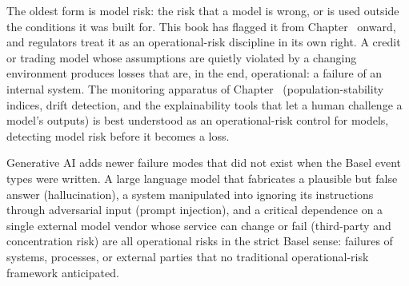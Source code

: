 \documentclass[../ai_in_finance]{subfiles}
\begin{document}
The oldest form is model risk: the risk that a model is wrong, or is used outside the conditions it was built for. This book has flagged it from Chapter~ onward, and regulators treat it as an operational-risk discipline in its own right. A credit or trading model whose assumptions are quietly violated by a changing environment produces losses that are, in the end, operational: a failure of an internal system. The monitoring apparatus of Chapter~ (population-stability indices, drift detection, and the explainability tools that let a human challenge a model's outputs) is best understood as an operational-risk control for models, detecting model risk before it becomes a loss.

Generative AI adds newer failure modes that did not exist when the Basel event types were written. A large language model that fabricates a plausible but false answer (hallucination), a system manipulated into ignoring its instructions through adversarial input (prompt injection), and a critical dependence on a single external model vendor whose service can change or fail (third-party and concentration risk) are all operational risks in the strict Basel sense: failures of systems, processes, or external parties that no traditional operational-risk framework anticipated.
\end{document}
